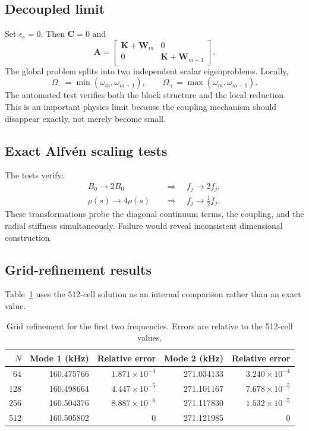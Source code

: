 \subsection{Decoupled limit}
Set $\epsilon_c=0$. Then $\mathbf C=0$ and
\begin{equation}
\mathbf A=
\begin{bmatrix}
\mathbf K+\mathbf W_m&0\\
0&\mathbf K+\mathbf W_{m+1}
\end{bmatrix}.
\end{equation}
The global problem splits into two independent scalar eigenproblems. Locally,
\begin{equation}
\Omega_-=\min(\omega_m,\omega_{m+1}),
\qquad
\Omega_+=\max(\omega_m,\omega_{m+1}).
\end{equation}
The automated test verifies both the block structure and the local reduction. This is an important physics limit because the coupling mechanism should disappear exactly, not merely become small.

\subsection{Exact Alfv\'en scaling tests}
The tests verify:
\begin{align}
B_0\rightarrow2B_0&\quad\Rightarrow\quad f_j\rightarrow2f_j,\\
\rho(s)\rightarrow4\rho(s)&\quad\Rightarrow\quad f_j\rightarrow\frac{1}{2}f_j.
\end{align}
These transformations probe the diagonal continuum terms, the coupling, and the radial stiffness simultaneously. Failure would reveal inconsistent dimensional construction.

\subsection{Grid-refinement results}
Table~\ref{tab:grid_refinement_textbook} uses the 512-cell solution as an internal comparison rather than an exact value.

\begin{table}[htbp]
\centering
\begin{tabular}{r r r r r}
\toprule
$N$ & Mode 1 (kHz) & Relative error & Mode 2 (kHz) & Relative error\\
\midrule
64  & 160.475766 & $1.871\times10^{-4}$ & 271.034133 & $3.240\times10^{-4}$\\
128 & 160.498664 & $4.447\times10^{-5}$ & 271.101167 & $7.678\times10^{-5}$\\
256 & 160.504376 & $8.887\times10^{-6}$ & 271.117830 & $1.532\times10^{-5}$\\
512 & 160.505802 & 0 & 271.121985 & 0\\
\bottomrule
\end{tabular}
\caption{Grid refinement for the first two frequencies. Errors are relative to the 512-cell values.}
\label{tab:grid_refinement_textbook}
\end{table}

